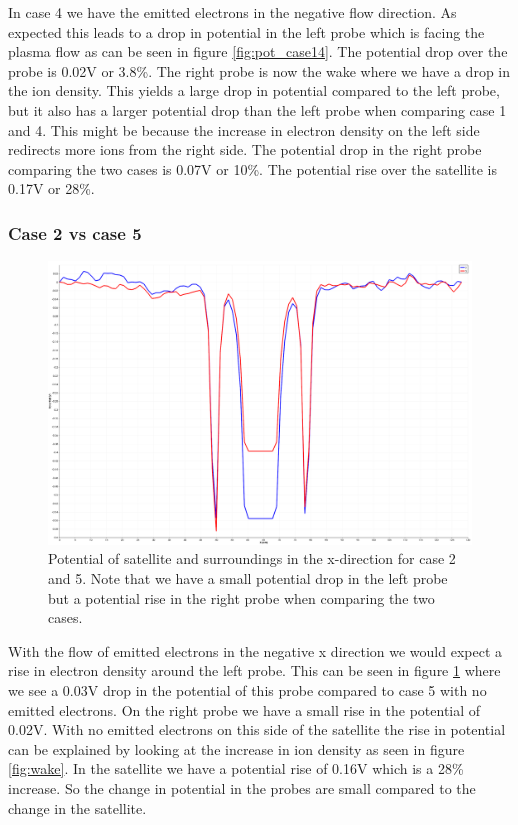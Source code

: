 In case 4 we have the emitted electrons in the negative flow direction. As expected this
leads to a drop in potential in the left probe which is facing the plasma flow as can be seen in figure \ref{fig:pot_case14}. The
potential drop over the probe is 0.02V or 3.8\%. The right probe is now the wake where we have
a drop in the ion density. This yields a large drop in potential compared to the left
probe, but it also has a larger potential drop than the left probe when comparing case 1 and 4. This
might be because the increase in electron density on the left side redirects more ions from the right side.
The potential drop in the right probe comparing the two cases is 0.07V or 10\%. The potential rise over the satellite is 0.17V or 28\%.


\subsubsection{Case 2 vs case 5}
\begin{figure}
    \centering
    \includegraphics[width = 0.6 \textwidth]{images/pot_case25_new.png}
    \caption{Potential of satellite and surroundings in the x-direction for case 2 and 5. Note that we have a small potential drop in the left probe but a potential rise in the right probe when comparing the two cases.}
    \label{fig:pot_case25}
\end{figure}

With the flow of emitted electrons in the negative x direction we would expect a rise in electron density around the left probe.
This can be seen in figure \ref{fig:pot_case25} where we see a 0.03V drop in the potential of this probe compared to case 5 with no emitted
electrons. On the right probe we have a small rise in the potential of 0.02V. With no emitted electrons on this side of the satellite the rise in
potential can be explained by looking at the increase in ion density as seen in figure \ref{fig:wake}.
In the satellite we have a potential rise of 0.16V which is a 28\% increase. So the change in potential in the probes are small compared to the change in the satellite.

